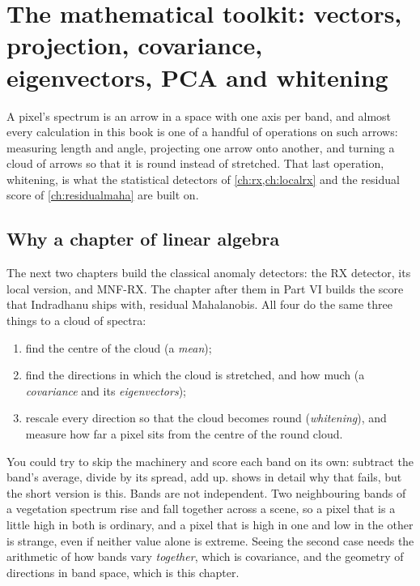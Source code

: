 \chapter{The mathematical toolkit: vectors, projection, covariance, eigenvectors, PCA and whitening}\label{ch:linalg}

\begin{onething}
A pixel's spectrum is an arrow in a space with one axis per band, and almost every calculation
in this book is one of a handful of operations on such arrows: measuring length and angle,
projecting one arrow onto another, and turning a cloud of arrows so that it is round instead of
stretched. That last operation, whitening, is what the statistical detectors of
\cref{ch:rx,ch:localrx} and the residual score of \cref{ch:residualmaha} are built on.
\end{onething}

\section{Why a chapter of linear algebra}\label{sec:linalg:why}

The next two chapters build the classical anomaly detectors: the RX detector, its local version,
and MNF-RX. The chapter after them in Part VI builds the score that Indradhanu ships with,
residual Mahalanobis. All four do the same three things to a cloud of spectra:
\begin{enumerate}
  \item find the centre of the cloud (a \emph{mean});
  \item find the directions in which the cloud is stretched, and how much (a \emph{covariance}
    and its \emph{eigenvectors});
  \item rescale every direction so that the cloud becomes round (\emph{whitening}), and measure
    how far a pixel sits from the centre of the round cloud.
\end{enumerate}

You could try to skip the machinery and score each band on its own: subtract the band's average,
divide by its spread, add up.  shows in detail why that fails, but the short version
is this. Bands are not independent. Two neighbouring bands of a vegetation spectrum rise and fall
together across a scene, so a pixel that is a little high in both is ordinary, and a pixel that
is high in one and low in the other is strange, even if neither value alone is extreme. Seeing
the second case needs the arithmetic of how bands vary \emph{together}, which is covariance, and
the geometry of directions in band space, which is this chapter.

